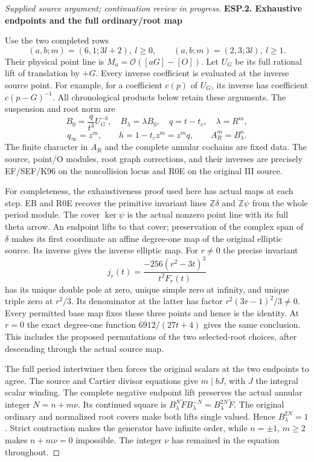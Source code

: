 \begin{proof}[Supplied source argument; continuation review in progress]
\par

\medskip\noindent\textbf{ESP.2. Exhaustive endpoints and the full ordinary/root map}

\par\nobreak

Use the two completed rows
\[
 (a,b;m)=(6,1;3l+2),\ l\ge0,
 \qquad (a,b;m)=(2,3;3l),\ l\ge1.
 \tag{ESP.8}
\]
Their physical point line is \(M_a=\mathcal O([aG]-[O])\).
Let \(U_G\) be its full rational lift of translation by \(+G\).
Every inverse coefficient is evaluated at the inverse source point.
For example, for a coefficient \(c(p)\) of \(U_G\), its inverse
has coefficient \(c(p-G)^{-1}\). All chronological products below
retain these arguments. The suspension and root norm are
\[
 B_0=\frac{q}{t^3}U_G^{-b},\quad B_\lambda=\lambda B_0,
 \quad q=t-t_c,\quad \lambda=R^m,
\]
\[
 q_\infty=z^m,\qquad h=1-t_cz^m=z^mq,
                         \qquad A_R^m=B_\lambda^n.
 \tag{ESP.9}
\]
The finite character in \(A_R\) and the complete annular cochains
are fixed data. The source, point/O modules, root graph corrections,
and their inverses are precisely EF/SEF/K96 on the noncollision locus
and R0E on the original III source.

For completeness, the exhaustiveness proof used here has actual
maps at each step. EB and R0E recover the primitive invariant lines
\(\mathbb Z\delta\) and \(\mathbb Z\psi\) from the whole period
module. The cover \(\ker\psi\) is the actual nonzero point line
with its full theta arrow. An endpoint lifts to that cover; preservation
of the complex span of \(\delta\) makes its first coordinate an affine
degree-one map of the original elliptic source. Its inverse gives the
inverse elliptic map. For \(r\ne0\) the precise invariant
\[
 j_r(t)=\frac{-256(r^2-3t)^3}{t^2F_r(t)}
 \tag{ESP.10}
\]
has its unique double pole at zero, unique simple zero at infinity,
and unique triple zero at \(r^2/3\). Its denominator at the latter
has factor \(r^2(3r-1)^2/3\ne0\). Every permitted base map fixes
these three points and hence is the identity. At \(r=0\) the exact
degree-one function \(6912/(27t+4)\) gives the same conclusion.
This includes the proposed permutations of the two selected-root
choices, after descending through the actual source map.

The full period intertwiner then forces the original scalars at the
two endpoints to agree. The source and Cartier divisor equations
give \(m\mid bJ\), with \(J\) the integral scalar winding. The
complete negative endpoint lift preserves the actual annular integer
\(N=n+m\nu\). Its continued square is
\(B_\lambda^N\widetilde F B_\lambda^{-N}
=B_\lambda^{2N}\widetilde F\). The original ordinary and normalized
root covers make both lifts single valued. Hence \(B_\lambda^{2N}=1\).
Strict contraction makes the generator have infinite order, while
\(n=\pm1\), \(m\ge2\) makes \(n+m\nu=0\) impossible. The
integer \(\nu\) has remained in the equation throughout.


\end{proof}
